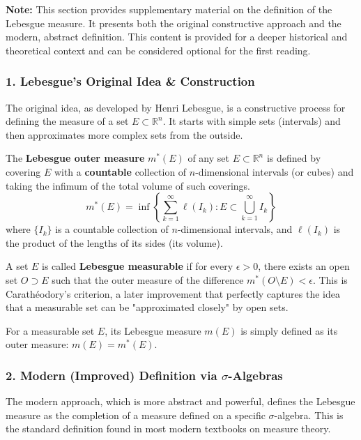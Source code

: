 \documentclass[oneside]{book}
\begin{document}
\begin{remark}
\textbf{Note:} This section provides supplementary material on the definition of the Lebesgue measure. It presents both the original constructive approach and the modern, abstract definition. This content is provided for a deeper historical and theoretical context and can be considered optional for the first reading.
\end{remark}

\subsubsection*{1. Lebesgue's Original Idea \& Construction}

The original idea, as developed by Henri Lebesgue, is a constructive process for defining the measure of a set \( E \subset \mathbb{R}^n \). It starts with simple sets (intervals) and then approximates more complex sets from the outside.

\begin{definition}
The \textbf{Lebesgue outer measure} \( m^*(E) \) of any set \( E \subset \mathbb{R}^n \) is defined by covering \( E \) with a \textbf{countable} collection of \( n \)-dimensional intervals (or cubes) and taking the infimum of the total volume of such coverings.
\[
m^*(E) = \inf \left\{ \sum_{k=1}^{\infty} \ell(I_k) : E \subset \bigcup_{k=1}^{\infty} I_k \right\}
\]
where \( \{I_k\} \) is a countable collection of \( n \)-dimensional intervals, and \( \ell(I_k) \) is the product of the lengths of its sides (its volume).

A set \( E \) is called \textbf{Lebesgue measurable} if for every \( \epsilon > 0 \), there exists an open set \( O \supset E \) such that the outer measure of the difference \( m^*(O \setminus E) < \epsilon \). This is Carathéodory's criterion, a later improvement that perfectly captures the idea that a measurable set can be "approximated closely" by open sets.

For a measurable set \( E \), its Lebesgue measure \( m(E) \) is simply defined as its outer measure: \( m(E) = m^*(E) \).
\end{definition}

\subsubsection*{2. Modern (Improved) Definition via \(\sigma\)-Algebras}

The modern approach, which is more abstract and powerful, defines the Lebesgue measure as the completion of a measure defined on a specific \(\sigma\)-algebra. This is the standard definition found in most modern textbooks on measure theory.
\end{document}
